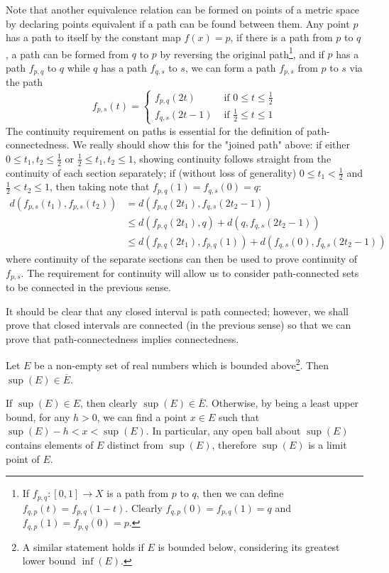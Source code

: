 Note that another equivalence relation can be formed on points of a metric space by declaring points equivalent if a path can be found between them. Any point $p$ has a path to itself by the constant map $f(x) = p$, if there is a path from $p$ to $q$, a path can be formed from $q$ to $p$ by reversing the original path\footnote{If $f_{p,q} : [0,1] \to X$ is a path from $p$ to $q$, then we can define $f_{q,p}(t) = f_{p,q}(1-t)$. Clearly $f_{q,p}(0) = f_{p,q}(1) = q$ and $f_{q,p}(1) = f_{p,q}(0) = p$.}, and if $p$ has a path $f_{p,q}$ to $q$ while $q$ has a path $f_{q,s}$ to $s$, we can form a path $f_{p,s}$ from $p$ to $s$ via the path
\begin{equation}
     f_{p,s}(t) = 
     \begin{cases}
     f_{p,q}(2t) & \text{ if } 0 \leq t \leq \frac{1}{2} \\
     f_{q,s}(2t-1) & \text{ if } \frac{1}{2} \leq t \leq 1
     \end{cases}
\end{equation}
The continuity requirement on paths is essential for the definition of path-connectedness. We really should show this for the "joined path" above: if either \mbox{$0\leq t_{1},t_{2} \leq \frac{1}{2}$} or \mbox{$\frac{1}{2} \leq t_{1}, t_{2} \leq 1$}, showing continuity follows straight from the continuity of each section separately; if (without loss of generality) \mbox{$0\leq t_{1} < \frac{1}{2}$} and \mbox{$\frac{1}{2} < t_{2} \leq 1$}, then taking note that \mbox{$f_{p,q}(1) = f_{q,s}(0) = q$}:
\begin{equation}
\begin{split}
    d(f_{p,s}(t_{1}), f_{p,s}(t_{2})) &= d({f_{p,q}(2t_{1}), f_{q,s}(2t_{2} - 1) }) \\
    &\leq d({f_{p,q}(2t_{1}), q}) + d({q, f_{q,s}(2t_{2} - 1) }) \\
     &\leq d({f_{p,q}(2t_{1}), f_{p,q}(1)}) + d({f_{q,s}(0), f_{q,s}(2t_{2} - 1) })
\end{split}
\end{equation}
where continuity of the separate sections can then be used to prove continuity of $f_{p,s}$. The requirement for continuity will allow us to consider path-connected sets to be connected in the previous sense.

It should be clear that any closed interval is path connected; however, we shall prove that closed intervals are connected (in the previous sense) so that we can prove that path-connectedness implies connectedness.
\begin{blemma}{}{}
Let $E$ be a non-empty set of real numbers which is bounded above\footnote{A similar statement holds if $E$ is bounded below, considering its greatest lower bound $\inf(E)$.}. Then \mbox{$\sup(E) \in \overline{E}$}.
\end{blemma}
\begin{bproof}{}{}
If $\sup(E) \in E$, then clearly $\sup(E)\in \overline{E}$. Otherwise, by being a least upper bound, for any $h>0$, we can find a point $x\in E$ such that $\sup(E) - h < x < \sup(E)$. In particular, any open ball about $\sup(E)$ contains elements of $E$ distinct from $\sup(E)$, therefore $\sup(E)$ is a limit point of $E$.
\eop
\end{bproof}

